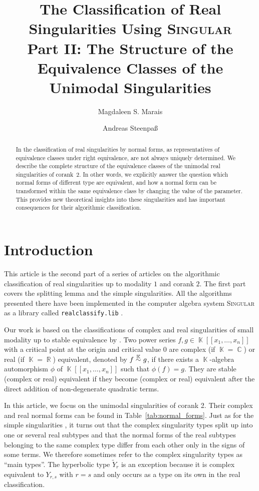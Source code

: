 \documentclass{amsproc}
\title[The Classification of Real Singularities Using \textsc{Singular}, %
Part II]%
{The Classification of Real Singularities Using \textsc{Singular}\\
Part II: The Structure of the Equivalence Classes of the Unimodal %
Singularities}
\author{Magdaleen S. Marais}
\author{Andreas Steenpa\ss}
\theoremstyle{definition}
\newcommand{\Singular}{\textsc{Singular}}
\newcommand{\realclassify}{\texttt{realclassify.lib}}
\newcommand{\tY}{\widetilde{Y}}
\DeclareMathOperator{\R}{\mathbb{R}}
\DeclareMathOperator{\C}{\mathbb{C}}
\DeclareMathOperator{\K}{\mathbb{K}}
\newcommand{\ksim}{\ensuremath{\mathrel{%
  \raisebox{0pt}[\heightof{$\overset{\scriptscriptstyle\K}{\sim}$}]{%
    $\overset{\K}{\sim}$%
  }%
}}}
\begin{document}
\begin{abstract}
In the classification of real singularities by \citet{AVG1985} normal forms, as
representatives of equivalence classes under right equivalence, are not always
uniquely determined. We describe the complete structure of the equivalence
classes of the unimodal real singularities of corank~$2$. In other words, we
explicitly answer the question which normal forms of different type are
equivalent, and how a normal form can be transformed within the same
equivalence class by changing the value of the parameter. This provides new
theoretical insights into these singularities and has important consequences
for their algorithmic classification.
\end{abstract}

\maketitle


\section{Introduction}

This article is the second part of a series of articles on the algorithmic
classification of real singularities up to modality $1$ and corank $2$. The
first part \citep{MS2013} covers the splitting lemma and the simple
singularities. All the algorithms presented there have been implemented in the
computer algebra system \Singular{} \citep{DGPS} as a library called
\realclassify{} \citep{realclassify}.

Our work is based on the classifications of complex and real singularities of
small modality up to stable equivalence by \citet{AVG1985}. Two power series
$f, g \in \K[[x_1,\ldots,x_n]]$ with a critical point at the origin and
critical value $0$ are complex (if $\K = \C$) or real (if $\K = \R$)
equivalent, denoted by $f \ksim g$, if there exists a $\K$-algebra automorphism
$\phi$ of $\K[[x_1,\ldots,x_n]]$ such that $\phi(f) = g$. They are stable
(complex or real) equivalent if they become (complex or real) equivalent after
the direct addition of non-degenerate quadratic terms.

In this article, we focus on the unimodal singularities of corank 2. Their
complex and real normal forms can be found in Table~\ref{tab:normal_forms}.
Just as for the simple singularities \citep[cf.][]{MS2013}, it turns out that
the complex singularity types split up into one or several real subtypes and
that the normal forms of the real subtypes belonging to the same complex type
differ from each other only in the signs of some terms. We therefore sometimes
refer to the complex singularity types as ``main types''. The hyperbolic type
$\tY_r$ is an exception because it is complex equivalent to $Y_{r,s}$ with
$r = s$ and only occurs as a type on its own in the real classification.
\end{document}

